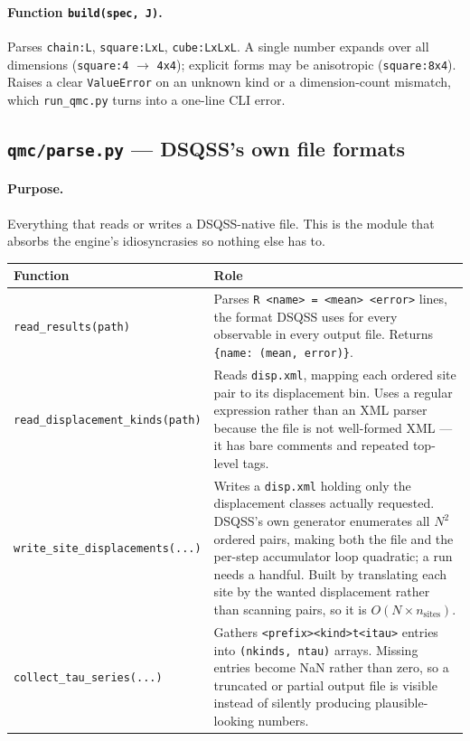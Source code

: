 \documentclass[11pt,a4paper]{article}
\newcommand{\code}[1]{\texttt{#1}}
\newcommand{\file}[1]{\texttt{\textbf{#1}}}
\begin{document}
\paragraph{Function \code{build(spec, J)}.} Parses \code{chain:L},
\code{square:LxL}, \code{cube:LxLxL}. A single number expands over all
dimensions (\code{square:4} $\to$ \code{4x4}); explicit forms may be anisotropic
(\code{square:8x4}). Raises a clear \code{ValueError} on an unknown kind or a
dimension-count mismatch, which \code{run\_qmc.py} turns into a one-line CLI
error.

\subsection{\file{qmc/parse.py} --- DSQSS's own file formats}

\paragraph{Purpose.} Everything that reads or writes a DSQSS-native file. This
is the module that absorbs the engine's idiosyncrasies so nothing else has to.

\begin{longtable}{@{}p{}p{}@{}}
\toprule
Function & Role \\
\midrule
\endhead
\code{read\_results(path)} &
  Parses \code{R <name> = <mean> <error>} lines, the format DSQSS uses for every
  observable in every output file. Returns \code{\{name: (mean, error)\}}. \\
\code{read\_displacement\_kinds(path)} &
  Reads \code{disp.xml}, mapping each ordered site pair to its displacement bin.
  Uses a regular expression rather than an XML parser because the file is not
  well-formed XML --- it has bare comments and repeated top-level tags. \\
\code{write\_site\_displacements(...)} &
  Writes a \code{disp.xml} holding only the displacement classes actually
  requested. DSQSS's own generator enumerates all $N^2$ ordered pairs, making
  both the file and the per-step accumulator loop quadratic; a run needs a
  handful. Built by translating each site by the wanted displacement rather than
  scanning pairs, so it is $O(N \times n_{\text{sites}})$. \\
\code{collect\_tau\_series(...)} &
  Gathers \code{<prefix><kind>t<itau>} entries into \code{(nkinds, ntau)} arrays.
  Missing entries become NaN rather than zero, so a truncated or partial output
  file is visible instead of silently producing plausible-looking numbers. \\
\bottomrule
\end{longtable}
\end{document}
